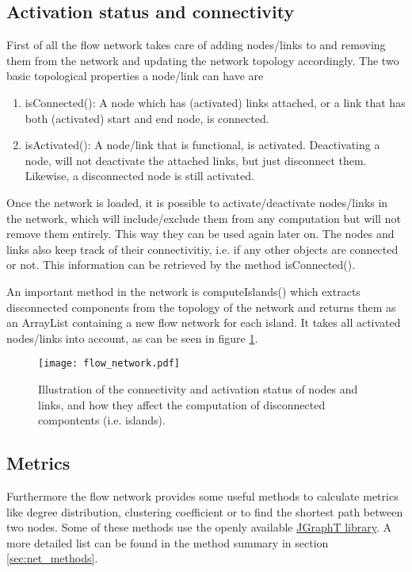 \documentclass[11pt,fleqn]{book} %
\begin{document}
\subsection{Activation status and connectivity}
First of all the flow network takes care of adding nodes/links to and removing them from the network and updating the network topology accordingly. The two basic topological properties a node/link can have are
\begin{enumerate}
	\item isConnected(): A node which has (activated) links attached, or a link that has both (activated) start and end node, is connected.
	\item isActivated(): A node/link that is functional, is activated. Deactivating a node, will not deactivate the attached links, but just disconnect them. Likewise, a disconnected node is still activated.
\end{enumerate}

Once the network is loaded, it is possible to activate/deactivate nodes/links in the network, which will include/exclude them from any computation but will not remove them entirely. This way they can be used again later on. The nodes and links also keep track of their connectivitiy, i.e. if any other objects are connected or not. This information can be retrieved by the method isConnected().

An important method in the network is computeIslands() which extracts disconnected components from the topology of the network and returns them as an ArrayList containing a new flow network for each island. It takes all activated nodes/links into account, as can be seen in figure \ref{fig:flow_net}.

\begin{figure}[!h]
\centering\texttt{[image: flow\_network.pdf]}
\caption{Illustration of the connectivity and activation status of nodes and links, and how they affect the computation of disconnected compontents (i.e. islands).}
\label{fig:flow_net}
\end{figure}

\subsection{Metrics}
Furthermore the flow network provides some useful methods to calculate metrics like degree distribution, clustering coefficient or to find the shortest path between two nodes. Some of these methods use the openly available \href{http://jgrapht.org/}{JGraphT library}. A more detailed list can be found in the method summary in section \ref{sec:net_methods}.
\end{document}
